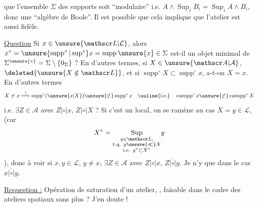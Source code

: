  que l'ensemble  $\Sigma$ des supports soit ``modulaire'' i.e. $A\wedge\operatorname{Sup}_{i} B_i=\operatorname{Sup}_{i} A\wedge B_i$, donc une ``algèbre de Boole''. Il est possible que cela implique que l'atelier est aussi fidèle.

\uline{Question} Si $x\in\unsure{\mathscr L|\mathcal L}$, alors $x^\circ=\unsure{\operatorname{supp}^\circ|\operatorname{sup}^\circ} x=\operatorname{supp}\unsure{x}\in\Sigma$ est-il un objet minimal de $\Sigma^{\unsure{*}}=\Sigma\setminus\{0_\Sigma\}$ ? En d'autres termes, si $X\in\unsure{\mathscr A|\mathcal A}$, $\deleted{\unsure{X\notin\mathscr L}}$, et si $\operatorname{supp}^\circ X\subset\operatorname{supp}^\circ x$, a-t-on $X=x$. En d'autres termes
\[
X\ne x\overset{?}{\Longrightarrow}\operatorname{supp}^\circ(\unsure{x|X})\unsure{\not\subset}\operatorname{supp}^\circ x
\quad\text{\uuline{i.e.}}\quad
\operatorname{cosupp}^\circ x\unsure{\not\subset}\operatorname{cosupp}^\circ X
\]
i.e. $\exists Z\in\mathscr A$ avec $Z|\circ|x$, $Z\overline{|\circ|}X$ ? Si c'est un local, on se ramène au cas $X=y\in\mathscr L$, (car
\[
X^\circ=\underset{\substack{y\in\mathscr L,\\\text{t.q. }y\unsure{\ll}X\\\text{i.e. }y^\circ\subset X^\circ}}{\operatorname{Sup}}y
\]
), donc à voir si $x,y\in\mathscr L$, $y\ne x$, $\exists Z\in\mathscr A$ avec $Z|\circ|x$, $Z\overline{|\circ|}y$. Je n'y  que dans le cas $x\overline{|\circ|}y$.

\uline{Requestion :} Opération de saturation d'un atelier, , faisable dans le cadre des ateliers spatiaux sans plus ? J'en doute !


